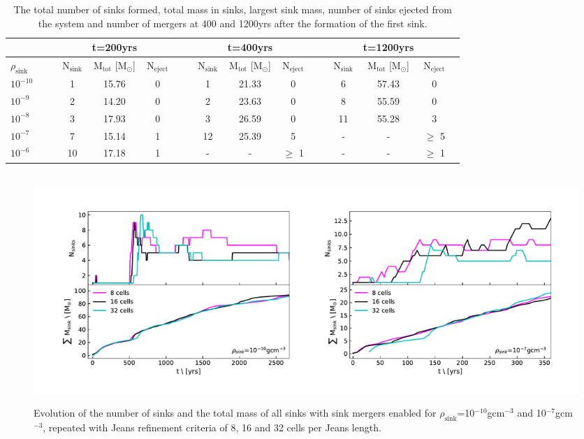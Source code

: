 \documentclass[fleqn,usenatbib]{mnras}
\begin{document}
\begin{table}
	\centering
	\caption{The total number of sinks formed, total mass in sinks, largest sink mass, number of sinks ejected from the system and number of mergers at 400 and 1200yrs after the formation of the first sink.}
	\label{table:2}
	\begin{tabular}{l c c c | c c c | c c | c c c | c c| c c c |} %
		\hline
		& &  & & t=200yrs & & & &  & t=400yrs & &  & &  &  t=1200yrs & \\
		\hline
		$\rho_{\text{sink}}$ & &  & N$_{\text{sink}}$ & M$_{\text{tot}}$ [M$_{\odot}$]  & N$_{\text{eject}}$& & &  N$_{\text{sink}}$ & M$_{\text{tot}}$ [M$_{\odot}$]  & N$_{\text{eject}}$ & & & N$_{\text{sink}}$ & M$_{\text{tot}}$ [M$_{\odot}$]   & N$_{\text{eject}}$  \\
		\hline
		$10^{-10}$ &&& 1 & 15.76 & 0 &&& 1  & 21.33 &   0    &&& 6  &  57.43    &  0   \\
		$10^{-9}$   &&& 2 & 14.20 & 0 &&& 2 & 23.63 &   0    &&& 8  &  55.59    &0   \\
		$10^{-8}$   &&& 3 & 17.93 & 0 &&& 3 & 26.59 &   0   &&&   11 &  55.28    &3    \\
		$10^{-7}$   &&& 7 & 15.14 & 1 &&&  12 & 25.39 &  5   &&& -  &  -            & $\geq$ 5   \\
		$10^{-6}$   &&& 10 & 17.18 & 1 &&&    -  &  -  & $\geq$ 1 &&& -& -& $\geq$ 1 \\
		\hline
	\end{tabular}
\end{table}



 
\begin{figure}
	\hbox{\hspace{-0.5cm} \includegraphics[scale=0.6]{jeans.pdf}}
    \caption{Evolution of the number of sinks and the total mass of all sinks with sink mergers enabled for $\rho_{\text{sink}}$=10$^{-10}$gcm$^{-3}$ and 10$^{-7}$gcm$^{-3}$, repeated with Jeans refinement criteria of 8, 16 and 32 cells per Jeans length.}
    \label{fig:jeans}
\end{figure}
\end{document}
